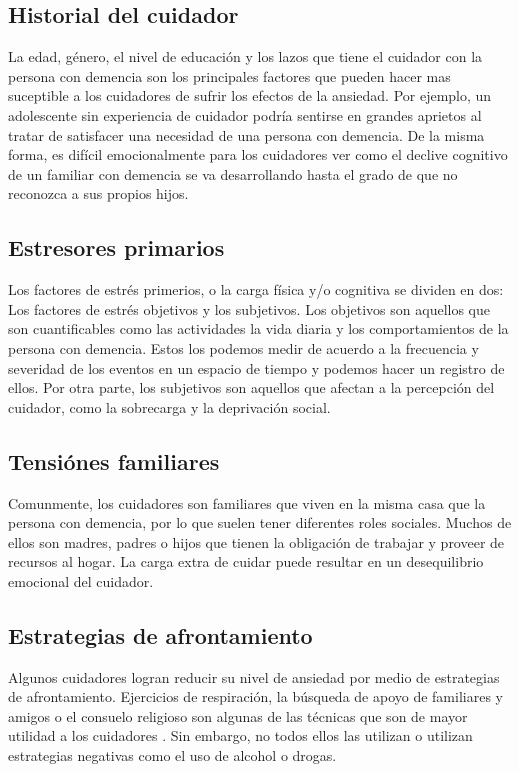 	\subsection{Historial del cuidador}{\label{secc:modeloAnsiedadCaregivers}}
		La edad, g\'enero, el nivel de educaci\'on y los lazos que tiene el cuidador con la persona con demencia son los principales factores que pueden hacer mas suceptible a los cuidadores de sufrir los efectos de la ansiedad. Por ejemplo, un adolescente sin experiencia de cuidador podr\'ia sentirse en grandes aprietos al tratar de satisfacer una necesidad de una persona con demencia. De la misma forma, es dif\'icil emocionalmente para los cuidadores ver como el declive cognitivo de un familiar con demencia se va desarrollando hasta el grado de que no reconozca a sus propios hijos.
	\subsection{Estresores primarios}{\label{secc:modeloAnsiedadStressFactors}}
		Los factores de estr\'es primerios, o la carga f\'isica y/o cognitiva se dividen en dos: Los factores de estr\'es objetivos y los subjetivos. Los objetivos son aquellos que son cuantificables como las actividades la vida diaria y los comportamientos de la persona con demencia. Estos los podemos medir de acuerdo a la frecuencia y severidad de los eventos en un espacio de tiempo y podemos hacer un registro de ellos. Por otra parte, los subjetivos son aquellos que afectan a la percepci\'on del cuidador, como la sobrecarga y la deprivaci\'on social.
	\subsection{Tensi\'ones familiares}{\label{secc:modeloAnsiedadSecondaryroles}}
		Comunmente, los cuidadores son familiares que viven en la misma casa que la persona con demencia, por lo que suelen tener diferentes roles sociales. Muchos de ellos son madres, padres o hijos que tienen la obligaci\'on de trabajar y proveer de recursos al hogar. La carga extra de cuidar puede resultar en un desequilibrio emocional del cuidador.
	
	\subsection{Estrategias de afrontamiento}{\label{secc:modeloAnsiedadCoping}}
	Algunos cuidadores logran reducir su nivel de ansiedad por medio de estrategias de afrontamiento. Ejercicios de respiraci\'on, la b\'usqueda de apoyo de familiares y amigos o el consuelo religioso son algunas de las t\'ecnicas que son de mayor utilidad a los cuidadores \citep{Sharma20121287}.  Sin embargo, no todos ellos las utilizan o utilizan estrategias negativas como el uso de alcohol o drogas.

